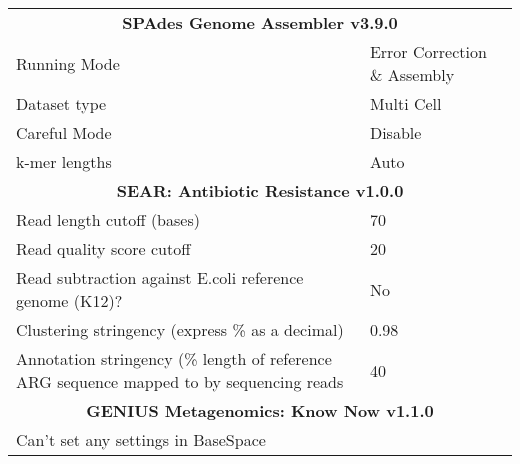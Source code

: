 \begin{table}[h!]
{\begin{tabular}{ll}
\multicolumn{2}{c}{\textbf{SPAdes Genome Assembler v3.9.0}}                             \\
Running Mode                                    & Error Correction \& Assembly \\
Dataset type                                    & Multi Cell                   \\
Careful Mode                                    & Disable                      \\
k-mer lengths                                   & Auto                         \\ \midrule
\multicolumn{2}{c}{\textbf{SEAR: Antibiotic Resistance v1.0.0}}                                           \\ \midrule
Read length cutoff (bases)                      & 70                           \\
Read quality score cutoff                       & 20                           \\
Read subtraction against E.coli reference genome (K12)?                                  & No             \\
Clustering stringency (express \% as a decimal) & 0.98                         \\
Annotation stringency (\% length of reference ARG sequence mapped to by sequencing reads & 40             \\\midrule
\multicolumn{2}{c}{\textbf{GENIUS Metagenomics: Know Now v1.1.0}}                                                  \\ \midrule
Can't set any settings in BaseSpace             & \\                    \midrule    
\end{tabular}%
}
\end{table}